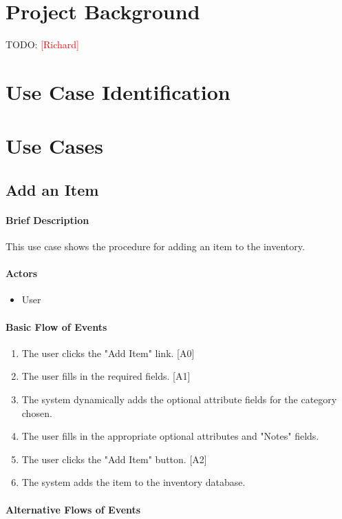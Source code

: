 \documentclass{article}
\newcommand{\richard}{\textcolor{red}{[Richard]}}
\begin{document}
\section{Project Background}
TODO: \richard

\section{Use Case Identification}

\section{Use Cases}

\subsection{Add an Item}

\paragraph{Brief Description}
This use case shows the procedure for adding an item to the inventory.

\paragraph{Actors}
\begin{itemize}
\item User
\end{itemize}

\paragraph{Basic Flow of Events}
\begin{enumerate}
\item The user clicks the "Add Item" link. [A0]
\item The user fills in the required fields. [A1]
\item The system dynamically adds the optional attribute fields for the category chosen.
\item The user fills in the appropriate optional attributes and "Notes" fields.
\item The user clicks the "Add Item" button. [A2]
\item The system adds the item to the inventory database.
\end{enumerate}

\paragraph{Alternative Flows of Events}
\end{document}
